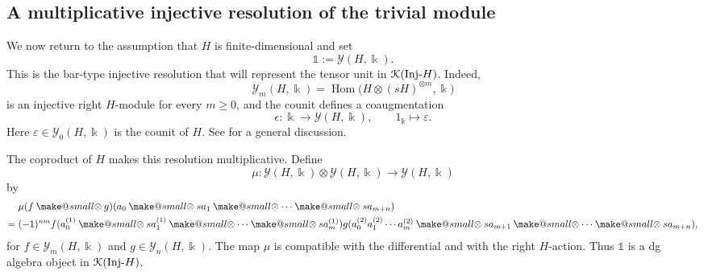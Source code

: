 \documentclass[a4paper, 11pt]{amsart}
\makeatletter
\theoremstyle{definition}
\theoremstyle{remark}
\numberwithin{equation}{section}
\newcommand{\Y}{\mathcal{Y}}
\newcommand{\EK}{\EuScript{K}}
\newcommand{\smallotimes}{\mathbin{\mathpalette\make@small\otimes}}
\newcommand{\make@small}[2]{%
  \vcenter{\hbox{%
    $\m@th\ifx#1\displaystyle\scriptstyle\else\ifx#1\textstyle\scriptstyle
     \else\scriptscriptstyle\fi\fi#2$%
  }}%
}
\makeatother
\begin{document}
\subsection{A multiplicative injective resolution of the trivial module}
We now return to the assumption that $H$ is finite-dimensional and set
\[
\mathbb 1:=\Y(H,\Bbbk).
\]
This is the bar-type injective resolution that will represent the tensor unit in $\EK(\mathrm{Inj}\text{-}H)$. Indeed,
\[
\Y_m(H,\Bbbk)=\operatorname{Hom}\bigl(H\otimes(sH)^{\otimes m},\Bbbk\bigr)
\]
is an injective right $H$-module for every $m\geq0$, and the counit defines a coaugmentation
\[
\epsilon\colon\Bbbk\longrightarrow\Y(H,\Bbbk),
\qquad
1_\Bbbk\longmapsto\varepsilon.
\]
Here $\varepsilon\in\Y_0(H,\Bbbk)$ is the counit of $H$. See \cite[Subsection 3.2]{ChWa1} for a general discussion.

The coproduct of $H$ makes this resolution multiplicative. Define
\[
\mu\colon\Y(H,\Bbbk)\otimes\Y(H,\Bbbk)
\longrightarrow\Y(H,\Bbbk)
\]
by
\begin{align*}
&\mu(f\smallotimes g)(a_0\smallotimes sa_1\smallotimes\dotsb\smallotimes sa_{m+n})\\
={}&(-1)^{nm}
 f(a_0^{(1)}\smallotimes sa_1^{(1)}\smallotimes\dotsb\smallotimes sa_m^{(1)})
 g(a_0^{(2)}a_1^{(2)}\dotsb a_m^{(2)}\smallotimes sa_{m+1}\smallotimes\dotsb\smallotimes sa_{m+n}),
\end{align*}
for $f\in\Y_m(H,\Bbbk)$ and $g\in\Y_n(H,\Bbbk)$. The map $\mu$ is compatible with the differential and with the right $H$-action. Thus $\mathbb 1$ is a dg algebra object in $\EK(\mathrm{Inj}\text{-}H)$.
\end{document}
